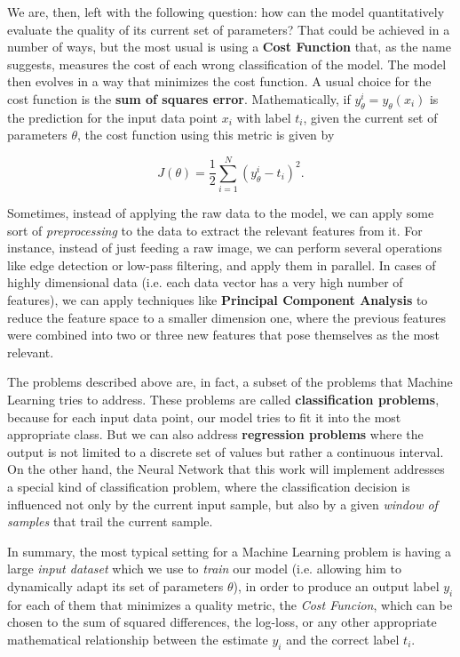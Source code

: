 We are, then, left with the following question: how can the model quantitatively evaluate the quality of its current set of parameters? That could be achieved in a number of ways, but the most usual is using a \textbf{Cost Function} that, as the name suggests, measures the cost of each wrong classification of the model. The model then evolves in a way that minimizes the cost function. A usual choice for the cost function is the \textbf{sum of squares error}. Mathematically, if $y_{\theta}^i = y_{\theta}(x_i)$ is the prediction for the input data point $x_i$ with label $t_i$, given the current set of parameters $\theta$, the cost function using this metric is given by

\begin{equation}\label{eq:costfunctionFund}
	J(\theta) = \frac{1}{2} \sum_{i=1}^N \left( y_{\theta}^i - t_i \right)^2.
\end{equation}

Sometimes, instead of applying the raw data to the model, we can apply some sort of \emph{preprocessing} to the data to extract the relevant features from it. For instance, instead of just feeding a raw image, we can perform several operations like edge detection or low-pass filtering, and apply them in parallel. In cases of highly dimensional data (i.e. each data vector has a very high number of features), we can apply techniques like \textbf{Principal Component Analysis} to reduce the feature space to a smaller dimension one, where the previous features were combined into two or three new features that pose themselves as the most relevant.

The problems described above are, in fact, a subset of the problems that Machine Learning tries to address. These problems are called \textbf{classification problems}, because for each input data point, our model tries to fit it into the most appropriate class. But we can also address \textbf{regression problems} where the output is not limited to a discrete set of values but rather a continuous interval. On the other hand, the Neural Network that this work will implement addresses a special kind of classification problem, where the classification decision is influenced not only by the current input sample, but also by a given \emph{window of samples} that trail the current sample.

In summary, the most typical setting for a Machine Learning problem is having a large \textit{input dataset} which we use to \textit{train} our model (i.e. allowing him to dynamically adapt its set of parameters $\theta$), in order to produce an output label $y_i$ for each of them that minimizes a quality metric, the \textit{Cost Funcion}, which can be chosen to the sum of squared differences, the log-loss, or any other appropriate  mathematical relationship  between the estimate $y_i$ and the correct label $t_i$. 

